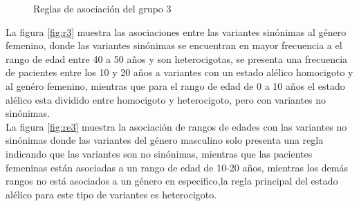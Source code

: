 \begin{figure}[h!]
	\centering
	\caption{Reglas de asociación del grupo 3}\label{fig:reglas3}
\end{figure}

La figura \ref{fig:r3} muestra las asociaciones entre las variantes sinónimas al género femenino, donde las variantes sinónimas se encuentran en mayor frecuencia a el rango de edad entre 40 a 50 años y son heterocigotas, se presenta una frecuencia de pacientes entre los 10 y 20 años a variantes con un estado alélico homocigoto y al genéro femenino, mientras que para el rango de edad de 0 a 10 años el estado alélico esta dividido entre homocigoto y heterocigoto, pero con variantes no sinónimas. \\

La figura \ref{fig:re3} muestra la asociación de rangos de edades con las variantes no sinónimas donde las variantes del género masculino solo presenta una regla indicando que las variantes son no sinónimas, mientras que las pacientes femeninas están asociadas a un rango de edad de 10-20 años, mientras los demás rangos no está asociados a un género en especifico,la regla principal del estado alélico para este tipo de variantes es heterocigoto. \\

